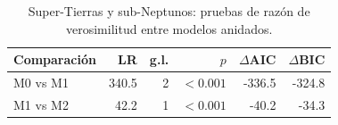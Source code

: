 \begin{table}[htbp]
    \centering
    \caption{Super-Tierras y sub-Neptunos: pruebas de razón de verosimilitud entre modelos anidados.}
    \label{tab:Z-T4}
    \small
    \begin{tabular}{lrrrrr}
    \toprule
    Comparación & LR & g.l. & $p$ & $\Delta$AIC & $\Delta$BIC \\
    \midrule
    M0 vs M1 & 340.5 & 2 & $<0.001$ & -336.5 & -324.8 \\
    M1 vs M2 & 42.2 & 1 & $<0.001$ & -40.2 & -34.3 \\
    \bottomrule
    \end{tabular}
\end{table}

